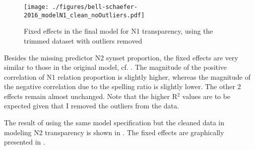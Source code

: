 \begin{figure}[p]
  \centering
\texttt{[image: ./figures/bell-schaefer-2016\_modelN1\_clean\_noOutliers.pdf]}
  \caption{Fixed effects in the final model for N1 transparency, using the trimmed dataset with outliers removed}
\label{fig:bs2016_N1_final}
\end{figure}

Besides the missing predictor N2 synset proportion, the fixed effects
are very similar to those in the original model,
cf. . The magnitude of
the positive correlation of N1 relation proportion is slightly higher,
whereas the magnitude of the negative correlation due to the spelling
ratio is slightly lower. The other 2 effects remain almost
unchanged. Note that the higher R$^2$ values are to be expected given
that I removed the outliers from the data.

\pagebreak[4]
The result of using the same model specification but the cleaned data
in modeling N2 transparency is shown in . The fixed effects
are graphically presented in .

